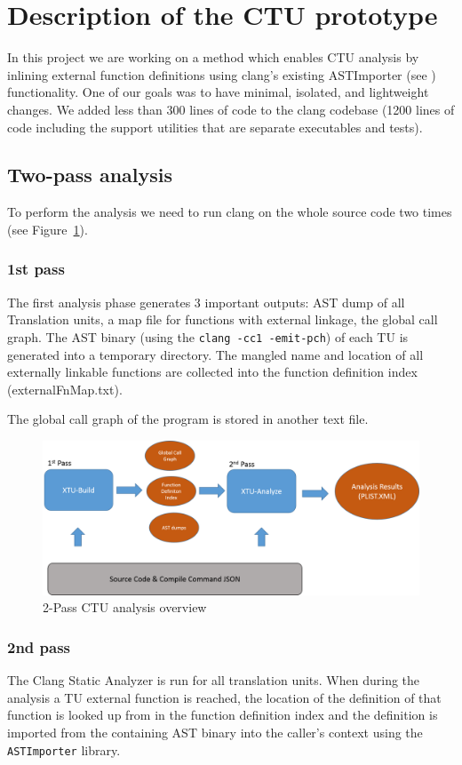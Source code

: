 \documentclass{article}
\begin{document}
\section{Description of the CTU prototype}
In this project we are working on a method which enables CTU analysis 
by inlining external function definitions using clang's existing ASTImporter 
(see \cite{astimporter}) functionality.
One of our goals was to have minimal, isolated, and lightweight changes.
We added less than 300 lines of code to the clang codebase 
(1200 lines of code including the support utilities that are 
  separate executables and tests). 

\subsection{Two-pass analysis}
To perform the analysis we need to run clang on the whole source code two times 
(see Figure~\ref{figctu}).

\subsubsection*{1st pass}
The first analysis phase generates 3 important outputs: AST dump of all
Translation units, a map file for functions with external linkage, the global call graph.
The AST binary (using the {\tt clang -cc1 -emit-pch}) 
of each TU is generated into a temporary directory. 
The mangled name and location of all externally linkable functions 
are collected into the function definition index (externalFnMap.txt). 

The global call graph of the program is stored in another text file.

\begin{figure}[h!]
\includegraphics[width=\textwidth]{images/ctu.png}
\caption{2-Pass CTU analysis overview}
\label{figctu}
\end{figure}

\subsubsection*{2nd pass}
The Clang Static Analyzer is run for all translation units. When during the
analysis a TU external function is reached, the location of the definition 
of that function is looked up from in the function definition index and the 
definition is imported from the containing AST binary into the caller's context
using the \texttt{ASTImporter} library.
\end{document}
